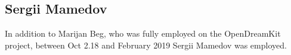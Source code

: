 \documentclass{deliverablereport}
\begin{document}
\subsection{Sergii Mamedov}

In addition to Marijan Beg, who was fully employed on the OpenDreamKit project, between Oct 2.18 and February 2019 Sergii Mamedov was employed.

\end{document}
